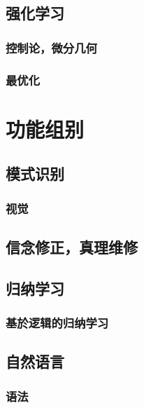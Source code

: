 \documentclass[12pt,a4paper]{report}
\newcommand{\cc}[2]{#1}
\newcommand{\cc}[2]{#2}
\theoremstyle{examples} \newtheorem{example}{Example}[section]
\begin{document}
\chapter{\cc{强化学习}{Reinforcement learning}}

	\section{\cc{控制论，微分几何}{Control theory / differential geometry}}
	
	\section{\cc{最优化}{Optimization}}
	
\part{\cc{功能组别}{Faculties}}

\chapter{\cc{模式识别}{Pattern recognition}}

	\section{\cc{视觉}{Vision}}

\chapter{\cc{信念修正，真理维修}{Belief revision / truth maintenance}}

\chapter{\cc{归纳学习}{Inductive learning}}

	\section{\cc{基於逻辑的归纳学习}{Logic-based inductive learning}}

\chapter{\cc{自然语言}{Natural language}}

	\section{\cc{语法}{Syntax theory}}
\end{document}
